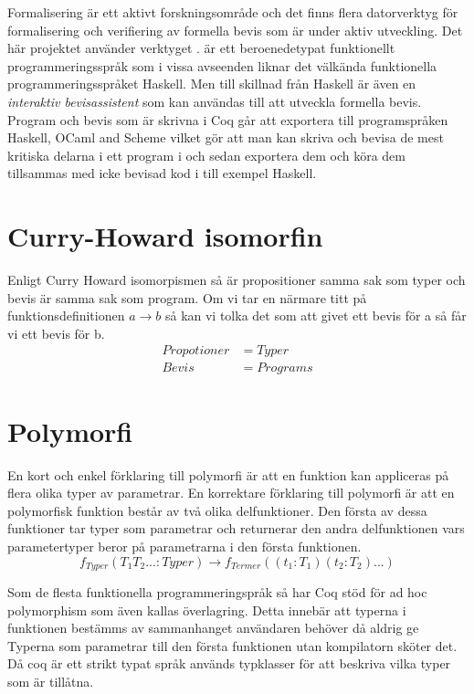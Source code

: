 Formalisering är ett aktivt forskningsområde och det finns flera datorverktyg
för formalisering och verifiering av formella bevis som är under aktiv
utveckling. Det här projektet använder verktyget \coq. \coq är ett
beroenedetypat funktionellt programmeringsspråk som i vissa avseenden liknar
det välkända funktionella programmeringsspråket Haskell. Men till skillnad från
Haskell är \coq även en \emph{interaktiv bevisassistent} som kan användas till
att utveckla formella bevis. Program och bevis som är skrivna i Coq går att
exportera till programspråken Haskell, OCaml and Scheme vilket gör att man kan
skriva och bevisa de mest kritiska delarna i ett program i \coq och sedan
exportera dem och köra dem tillsammas med icke bevisad kod i till exempel
Haskell.

\section{Curry-Howard isomorfin}
Enligt Curry Howard isomorpismen så är propositioner samma sak som typer och
bevis är samma sak som program. Om vi tar en närmare titt på
funktionsdefinitionen $a \rightarrow b$ så kan vi tolka det som att givet ett
bevis för a så får vi ett bevis för b.
\begin{align*}
  Propotioner &= Typer \\
  Bevis       &= Programs
\end{align*}

\section{Polymorfi}
En kort och enkel förklaring till polymorfi är att en funktion kan appliceras
på flera olika typer av parametrar. En korrektare förklaring till polymorfi är
att en polymorfisk funktion består av två olika delfunktioner. Den första av
dessa funktioner tar typer som parametrar och returnerar den andra
delfunktionen vars parametertyper beror på parametrarna i den första
funktionen.
\begin{equation}
  f_{Typer}(T_1 T_2 ... : Typer) \rightarrow f_{Termer}((t_1 : T_1) (t_2 : T_2) ...)
\end{equation}

Som de flesta funktionella programmeringspråk så har Coq stöd för ad hoc
polymorphism som även kallas överlagring. Detta innebär att typerna i
funktionen bestämms av sammanhanget användaren behöver då aldrig ge Typerna som
parametrar till den första funktionen utan kompilatorn sköter det. Då coq är
ett strikt typat språk används typklasser för att beskriva vilka typer som är
tillåtna.

